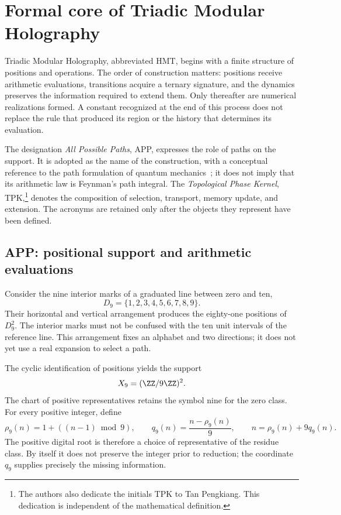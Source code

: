 \section{Formal core of Triadic Modular Holography}
\label{sec:nucleo}

Triadic Modular Holography, abbreviated HMT, begins with a finite structure of positions and operations. The order of construction matters: positions receive arithmetic evaluations, transitions acquire a ternary signature, and the dynamics preserves the information required to extend them. Only thereafter are numerical realizations formed. A constant recognized at the end of this process does not replace the rule that produced its region or the history that determines its evaluation.

The designation \emph{All Possible Paths}, APP, expresses the role of paths on the support. It is adopted as the name of the construction, with a conceptual reference to the path formulation of quantum mechanics~\cite{feynman1948}; it does not imply that its arithmetic law is Feynman's path integral. The \emph{Topological Phase Kernel}, TPK,\footnote{The authors also dedicate the initials TPK to Tan Pengkiang. This dedication is independent of the mathematical definition.} denotes the composition of selection, transport, memory update, and extension. The acronyms are retained only after the objects they represent have been defined.

\subsection{APP: positional support and arithmetic evaluations}

Consider the nine interior marks of a graduated line between zero and ten,
\[
 D_9=\{1,2,3,4,5,6,7,8,9\}.
\]
Their horizontal and vertical arrangement produces the eighty-one positions of \(D_9^2\). The interior marks must not be confused with the ten unit intervals of the reference line. This arrangement fixes an alphabet and two directions; it does not yet use a real expansion to select a path.

The cyclic identification of positions yields the support
\[
 X_9=(\ZZ/9\ZZ)^2.
\]
The chart of positive representatives retains the symbol nine for the zero class. For every positive integer, define
\begin{equation}
 \rho_9(n)=1+((n-1)\bmod9),\qquad
 q_9(n)=\frac{n-\rho_9(n)}9,
 \qquad n=\rho_9(n)+9q_9(n).
 \label{eq:residuo-cociente}
\end{equation}
The positive digital root is therefore a choice of representative of the residue class. By itself it does not preserve the integer prior to reduction; the coordinate \(q_9\) supplies precisely the missing information.

